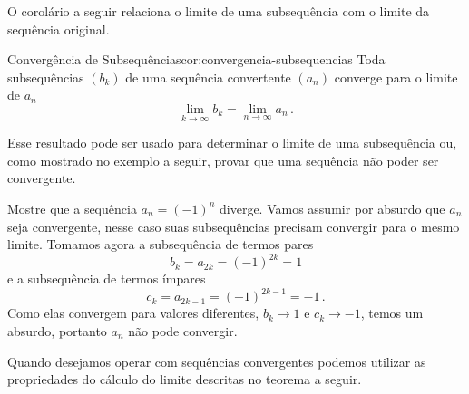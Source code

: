 O corolário a seguir relaciona o limite de uma subsequência com o limite da
sequência original.

\begin{corolario}{Convergência de Subsequências}{cor:convergencia-subsequencias}
	Toda subsequências $(b_k)$ de uma sequência convertente $(a_n)$
  converge para o limite de $a_n$
	\[
		\lim_{k\to\infty} b_k = \lim_{n\to \infty} a_n  \,.
	\]
\end{corolario}

Esse resultado pode ser usado para determinar o limite de uma subsequência ou,
como mostrado no exemplo a seguir, provar que uma sequência não poder ser
convergente.

\begin{example}
	Mostre que a sequência $a_n = (-1)^n$ diverge.
	\solution
	Vamos assumir por absurdo que $a_n$ seja convergente,
	nesse caso suas subsequências precisam convergir para o mesmo limite.
	Tomamos agora a subsequência de termos pares
	\[
		b_k = a_{2k} = (-1)^{2k} = 1
	\]
	e a subsequência de termos ímpares
	\[
		c_k = a_{2k-1} = (-1)^{2k-1} = -1  \,.
	\]
	Como elas convergem para valores diferentes,
	$b_k\to 1$ e $c_k\to -1$,
	temos um absurdo,
	portanto $a_n$ não pode convergir.
\end{example}

Quando desejamos operar com sequências convergentes podemos utilizar
as propriedades do cálculo do limite descritas no teorema a seguir.

